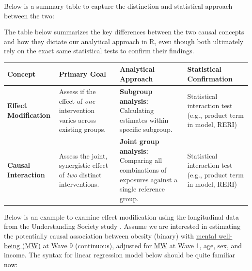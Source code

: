 \documentclass[
]{book}
\newcounter{none} %
\begin{document}
Below is a summary table to capture the distinction and statistical approach between the two:

The table below summarizes the key differences between the two causal concepts and how they dictate our analytical approach in R, even though both ultimately rely on the exact same statistical tests to confirm their findings.

{\def\LTcaptype{none} %
\begin{longtable}[]{@{}
  >{\raggedright\arraybackslash}p{}
  >{\raggedright\arraybackslash}p{}
  >{\raggedright\arraybackslash}p{}
  >{\raggedright\arraybackslash}p{}@{}}
\toprule\noalign{}
\begin{minipage}[b]{\linewidth}\raggedright
Concept
\end{minipage} & \begin{minipage}[b]{\linewidth}\raggedright
Primary Goal
\end{minipage} & \begin{minipage}[b]{\linewidth}\raggedright
Analytical Approach
\end{minipage} & \begin{minipage}[b]{\linewidth}\raggedright
Statistical Confirmation
\end{minipage} \\
\midrule\noalign{}
\endhead
\bottomrule\noalign{}
\endlastfoot
\textbf{Effect Modification} & Assess if the effect of \emph{one} intervention varies across existing groups. & \textbf{Subgroup analysis:} Calculating estimates within specific subgroup. & Statistical interaction test (e.g., product term in model, RERI) \\
\textbf{Causal Interaction} & Assess the joint, synergistic effect of \emph{two} distinct interventions. & \textbf{Joint group analysis:} Comparing all combinations of exposures against a single reference group. & Statistical interaction test (e.g., product term in model, RERI) \\
\end{longtable}
}

Below is an example to examine effect modification using the longitudinal data from the Understanding Society study \citep{buck2012understanding}. Assume we are interested in estimating the potentially causal association between obesity (binary) with \hyperref[acronyms_MW]{mental well-being (MW)} at Wave 9 (continuous), adjusted for \hyperref[acronyms_MW]{MW} at Wave 1, age, sex, and income. The syntax for linear regression model below should be quite familiar now:
\end{document}
